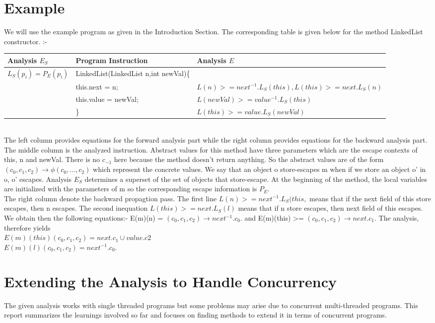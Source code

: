 \documentclass[peerreview]{IEEEtran}
\begin{document}
\section{Example}
We will use the example program as given in the Introduction Section. The corresponding table is given below for the method LinkedList constructor. :-
\begin{tabular}{p{6cm} | p{6cm} | p{6cm}}
\hline
Analysis $E_S$ & Program Instruction & Analysis $E$ \\
\hline
$L_S(p_i) = P_E(p_i)$ & LinkedList(LinkedList n,int newVal)\{ &  \\
 & this.next = n; & $L(n) >= next^{-1}.L_S(this), L(this) >= next.L_S(n)$ \\
 & this.value = newVal; & $L(newVal) >= value^{-1}.L_S(this)$ \\
 & \} & $L(this) >= value.L_S(newVal)$\\
\hline
\end{tabular}
\\[10pt]
The left column provides equations for the forward analysis part while the right column provides equations for the backward analysis part. \\
The middle column is the analyzed instruction. Abstract values for this method have three parameters which are the escape contexts of this, n and newVal. There is no $c_{-1}$ here because the method doesn't return anything. So the abstract values are of the form ${(c_0,c_1,c_2) \rightarrow \phi(c_0,...,c_2)}$ which represent the concrete values. We say that an object o store-escapes m when if we store an object o' in o, o' escapes. Analysis $E_S$ determines a superset of the set of objects that store-escape. At the beginning of the method, the local variables are initialized with the parameters of m so the corresponding escape information is $P_E$. \\
The right column denote the backward propagtion pass. The first line  $L(n) >= next^{-1}.L_S(this,$ means that if the next field of this store escapes, then n escapes. The second inequation  $L(this) >= next.L_S(l)$ means that if n store escapes, then next field of this escapes. We obtain then the following equations:-
E(m)(n) = $(c_0,c_1,c_2) \rightarrow next^{-1}.c_0$. and E(m)(this) >= $(c_0,c_1,c_2) \rightarrow next.c_1$. The analysis, therefore yields \\
$E(m)(this)(c_0,c_1,c_2) = next.c_1 \cup value.c2$ \\
$E(m)(l)(c_0,c_1,c_2) = next^{-1}.c_0.$ \\
\section{Extending the Analysis to Handle Concurrency}
The given analysis works with single threaded programs but some problems may arise due to concurrent multi-threaded programs. This report summarizes the learnings involved so far and focuses on finding methods to extend it in terms of concurrent programs.
\end{document}
